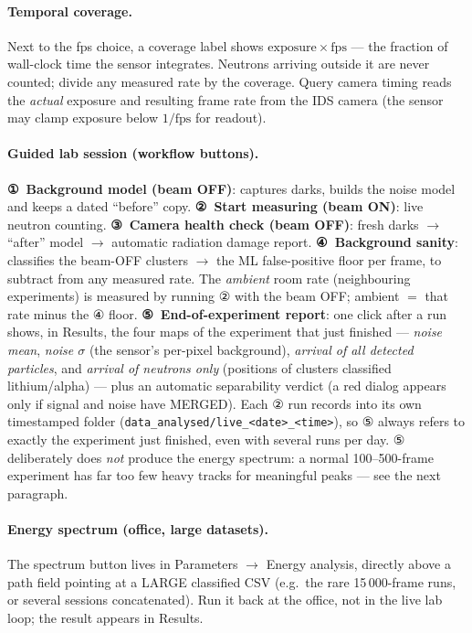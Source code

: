 \documentclass[11pt,a4paper]{article}
\newcommand{\gui}[1]{\textsf{#1}}
\begin{document}
\paragraph{Temporal coverage.} Next to the fps choice, a coverage label
shows $\mathrm{exposure} \times \mathrm{fps}$ — the fraction of wall-clock
time the sensor integrates. Neutrons arriving outside it are never counted;
divide any measured rate by the coverage. \gui{Query camera timing} reads
the \emph{actual} exposure and resulting frame rate from the IDS camera
(the sensor may clamp exposure below $1/\mathrm{fps}$ for readout).

\paragraph{Guided lab session (workflow buttons).}
\textbf{①~Background model (beam OFF)}: captures darks, builds the noise
model and keeps a dated ``before'' copy. \textbf{②~Start measuring (beam
ON)}: live neutron counting. \textbf{③~Camera health check (beam OFF)}:
fresh darks $\rightarrow$ ``after'' model $\rightarrow$ automatic radiation
damage report. \textbf{④~Background sanity}: classifies the beam-OFF
clusters $\rightarrow$ the ML false-positive floor per frame, to subtract
from any measured rate. The \emph{ambient} room rate (neighbouring
experiments) is measured by running ② with the beam OFF; ambient $=$ that
rate minus the ④ floor. \textbf{⑤~End-of-experiment report}: one click after
a run shows, in \gui{Results}, the four maps of the experiment that just
finished --- \emph{noise mean}, \emph{noise $\sigma$} (the sensor's
per-pixel background), \emph{arrival of all detected particles}, and
\emph{arrival of neutrons only} (positions of clusters classified
lithium/alpha) --- plus an automatic separability verdict (a red dialog
appears only if signal and noise have MERGED). Each ② run records into its
own timestamped folder (\texttt{data\_analysed/live\_<date>\_<time>}), so ⑤
always refers to exactly the experiment just finished, even with several
runs per day. ⑤ deliberately does \emph{not} produce the energy spectrum: a
normal 100--500-frame experiment has far too few heavy tracks for meaningful
peaks --- see the next paragraph.

\paragraph{Energy spectrum (office, large datasets).} The spectrum button
lives in \gui{Parameters} $\rightarrow$ \gui{Energy analysis}, directly above
a path field pointing at a LARGE classified CSV (e.g.\ the rare
15\,000-frame runs, or several sessions concatenated). Run it back at the
office, not in the live lab loop; the result appears in \gui{Results}.
\end{document}
